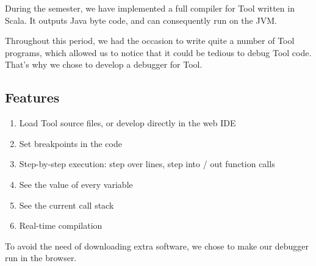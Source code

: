 During the semester, we have implemented a full compiler for Tool written in Scala. It outputs Java byte code, and can consequently run on the JVM.

Throughout this period, we had the occasion to write quite a number of Tool programs, which allowed us to notice that it could be tedious to debug Tool code. That's why we chose to develop a debugger for Tool.

\subsection{Features}

\begin{enumerate}
\item Load Tool source files, or develop directly in the web IDE
\item Set breakpoints in the code
\item Step-by-step execution: step over lines, step into / out function calls
\item See the value of every variable
\item See the current call stack
\item Real-time compilation
\end{enumerate}

To avoid the need of downloading extra software, we chose to make our debugger run in the browser.






